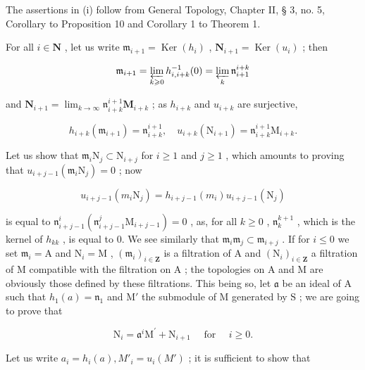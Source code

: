 The assertions in (i) follow from General Topology, Chapter II, § 3, no. 5, Corollary to Proposition 10 and Corollary 1 to Theorem 1.

For all \(i \in \mathbf{N}\) , let us write \(\mathfrak{m}_{i+1} = \operatorname{Ker}(h_i)\) , \(\mathbf{N}_{i+1} = \operatorname{Ker}(u_i)\) ; then

\[
\mathfrak {m} _ {i + 1} = \varprojlim_ {k \geqslant 0} h _ {i, i + k} ^ {- 1} (0) = \varprojlim_ {k} \mathfrak {n} _ {i + 1} ^ {i + k}
\]

and \(\mathbf{N}_{i + 1} = \lim_{k\to \infty}\mathfrak{n}_{i + k}^{i + 1}\mathbf{M}_{i + k}\) ; as \(h_{i + k}\) and \(u_{i + k}\) are surjective,

\[
h _ {i + k} \left(\mathfrak {m} _ {i + 1}\right) = \mathfrak {n} _ {i + k} ^ {i + 1}, \quad u _ {i + k} \left(\mathrm{N} _ {i + 1}\right) = \mathfrak {n} _ {i + k} ^ {i + 1} \mathrm{M} _ {i + k}.\tag{16}
\]

Let us show that \(\mathfrak{m}_i\mathrm{N}_j\subset \mathrm{N}_{i + j}\) for \(i\geqslant 1\) and \(j\geqslant 1\) , which amounts to proving that \(u_{i + j - 1}(\mathfrak{m}_i\mathrm{N}_j) = 0\) ; now

\[
u _ {i + j - 1} (m _ {i} \mathrm{N} _ {j}) = h _ {i + j - 1} (m _ {i}) u _ {i + j - 1} (\mathrm{N} _ {j})
\]

is equal to \(\mathfrak{n}_{i+j-1}^{i}(\mathfrak{n}_{i+j-1}^{j}\mathrm{M}_{i+j-1}) = 0\) , as, for all \(k \geqslant 0\) , \(\mathfrak{n}_k^{k+1}\) , which is the kernel of \(h_{kk}\) , is equal to 0. We see similarly that \(\mathfrak{m}_i\mathfrak{m}_j \subset \mathfrak{m}_{i+j}\) . If for \(i \leqslant 0\) we set \(\mathfrak{m}_i = \mathrm{A}\) and \(\mathrm{N}_i = \mathrm{M}\) , \((\mathfrak{m}_i)_{i \in \mathbf{Z}}\) is a filtration of \(\mathrm{A}\) and \((\mathrm{N}_i)_{i \in \mathbf{Z}}\) a filtration of \(\mathrm{M}\) compatible with the filtration on \(\mathrm{A}\) ; the topologies on \(\mathrm{A}\) and \(\mathrm{M}\) are obviously those defined by these filtrations. This being so, let \(\mathfrak{a}\) be an ideal of \(\mathrm{A}\) such that \(h_1(a) = \mathfrak{n}_1\) and \(\mathrm{M}'\) the submodule of \(\mathrm{M}\) generated by \(\mathrm{S}\) ; we are going to prove that

\[
\mathrm{N} _ {i} = \mathfrak {a} ^ {i} \mathrm{M} ^ {\prime} + \mathrm{N} _ {i + 1} \quad \text { for } \quad i \geqslant 0.\tag{17}
\]

Let us write \(a_i = h_i(a), M'_i = u_i(M')\) ; it is sufficient to show that

